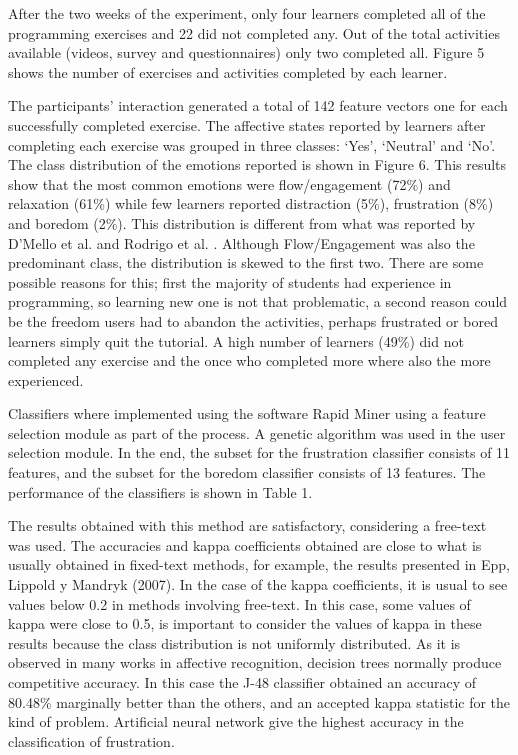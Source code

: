 \documentclass[conference]{IEEEtran}
\begin{document}
After the two weeks of the experiment, only four learners completed all of the
programming exercises and 22 did not completed any. Out of the total activities
available (videos, survey and questionnaires) only two completed all. Figure 5
shows the number of exercises and activities completed by each learner.
  
The participants' interaction generated a total of 142 feature vectors one for each
successfully completed exercise. The affective states reported by learners after
completing each exercise was grouped in three classes: ‘Yes’, ‘Neutral’ and
‘No’. The class distribution of the emotions reported is shown in Figure 6. This
results show that the most common emotions were flow/engagement (72\%) and
relaxation (61\%) while few learners reported distraction (5\%), frustration
(8\%) and boredom (2\%). This distribution is different from what was reported
by D’Mello et al. \cite{bixler2013detecting} and Rodrigo et al. \cite{rodrigo2009affective}.
Although Flow/Engagement was
also the predominant class, the distribution is skewed to the first two. There
are some possible reasons for this; first the majority of students had
experience in programming, so learning new one is not that problematic, a second
reason could be the freedom users had to abandon the activities, perhaps
frustrated or bored learners simply quit the tutorial. A high number of learners
(49\%) did not completed any exercise and the once who completed more where also
the more experienced.

Classifiers where implemented using the software Rapid Miner using a feature
selection module as part of the process. A genetic algorithm was used in the
user selection module. In the end, the subset for the frustration classifier
consists of 11 features, and the subset for the boredom classifier consists of
13 features. The performance of the classifiers is shown in Table 1. 

The results obtained with this method are satisfactory, considering a free-text
was used. The accuracies and kappa coefficients obtained are close to what is
usually obtained in fixed-text methods, for example, the results presented in
Epp, Lippold y Mandryk (2007). In the case of the kappa coefficients, it is
usual to see values below 0.2 in methods involving free-text. In this case, some
values of kappa were close to 0.5, is important to consider the values of kappa
in these results because the class distribution is not uniformly distributed. As
it is observed in many works in affective recognition, decision trees normally
produce competitive accuracy. In this case the J-48 classifier obtained an
accuracy of 80.48\% marginally better than the others, and an accepted kappa
statistic for the kind of problem. Artificial neural network give the highest
accuracy in the classification of frustration.
\end{document}
